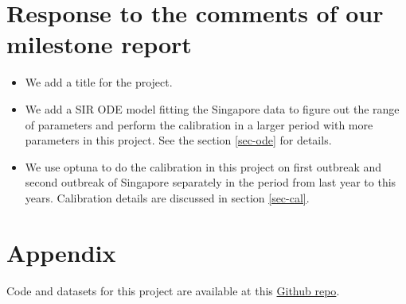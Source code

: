 \documentclass[sigconf, nonacm]{acmart}
\begin{document}

\section{Response to the comments of our milestone report}
\begin{itemize}
	\item We add a title for the project.
	\item We add a SIR ODE model fitting the Singapore data to figure out the range of parameters and perform the calibration in a larger period with more parameters in this project. See the section \ref{sec-ode} for details.
	\item We use optuna to do the calibration in this project on first outbreak and second outbreak of Singapore separately in the period from last year to this years. Calibration details are discussed in section \ref{sec-cal}.

\end{itemize}






\section{Appendix}
Code and datasets for this project are available at this \href{https://github.com/zs-liu/CSE8803-Singapore}{Github repo}.



\end{document}
